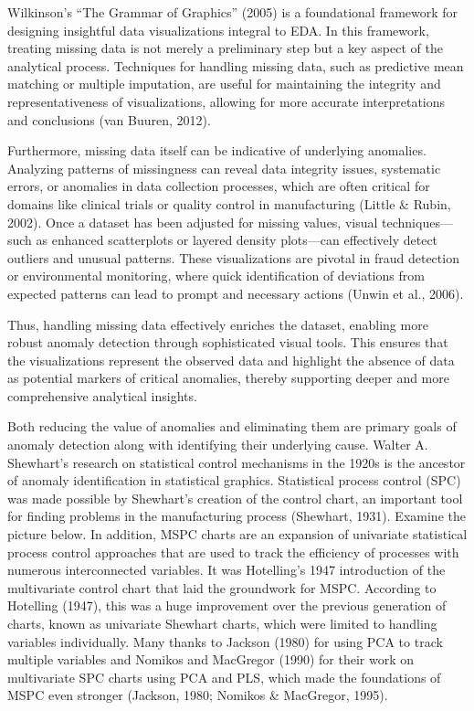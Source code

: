 \documentclass[print]{nuthesis}
\begin{document}
Wilkinson's ``The Grammar of Graphics'' (2005) is a foundational framework for designing insightful data visualizations integral to EDA.
In this framework, treating missing data is not merely a preliminary step but a key aspect of the analytical process.
Techniques for handling missing data, such as predictive mean matching or multiple imputation, are useful for maintaining the integrity and representativeness of visualizations, allowing for more accurate interpretations and conclusions (van Buuren, 2012).

Furthermore, missing data itself can be indicative of underlying anomalies.
Analyzing patterns of missingness can reveal data integrity issues, systematic errors, or anomalies in data collection processes, which are often critical for domains like clinical trials or quality control in manufacturing (Little \& Rubin, 2002).
Once a dataset has been adjusted for missing values, visual techniques---such as enhanced scatterplots or layered density plots---can effectively detect outliers and unusual patterns.
These visualizations are pivotal in fraud detection or environmental monitoring, where quick identification of deviations from expected patterns can lead to prompt and necessary actions (Unwin et al., 2006).

Thus, handling missing data effectively enriches the dataset, enabling more robust anomaly detection through sophisticated visual tools.
This ensures that the visualizations represent the observed data and highlight the absence of data as potential markers of critical anomalies, thereby supporting deeper and more comprehensive analytical insights.

Both reducing the value of anomalies and eliminating them are primary goals of anomaly detection along with identifying their underlying cause.
Walter A. Shewhart's research on statistical control mechanisms in the 1920s is the ancestor of anomaly identification in statistical graphics.
Statistical process control (SPC) was made possible by Shewhart's creation of the control chart, an important tool for finding problems in the manufacturing process (Shewhart, 1931). Examine the picture below.
In addition, MSPC charts are an expansion of univariate statistical process control approaches that are used to track the efficiency of processes with numerous interconnected variables.
It was Hotelling's 1947 introduction of the multivariate control chart that laid the groundwork for MSPC.
According to Hotelling (1947), this was a huge improvement over the previous generation of charts, known as univariate Shewhart charts, which were limited to handling variables individually.
Many thanks to Jackson (1980) for using PCA to track multiple variables and Nomikos and MacGregor (1990) for their work on multivariate SPC charts using PCA and PLS, which made the foundations of MSPC even stronger (Jackson, 1980; Nomikos \& MacGregor, 1995).
\end{document}
